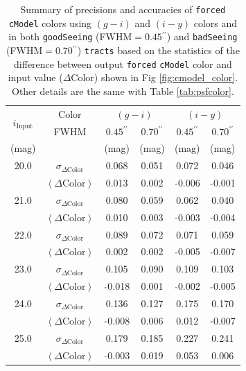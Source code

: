 \documentclass[useamsfonts]{pasj01}
\def\asec{$^{\prime\prime}$}
\def\cmodel{\texttt{cModel}}
\def\forced{\texttt{forced}}
\def\tracts{\texttt{tracts}}
\newcommand{\minus}{\raisebox{.4\height}{\scalebox{.8}{-}}}
\newcommand{\scolor}{$\sigma_{\Delta\mathrm{Color}}$}
\newcommand{\mcolor}{$\left<{\Delta\mathrm{Color}}\right>$}
\newcommand{\n}{$\minus$}
\begin{document}
\begin{table}
    \begin{center}
    \begin{tabular}{| c | c | c | c | c | c | }
    \hline
    \rowcolor[gray]{.85} \multicolumn{6}{|c|}{\large{Table}: Summary of \forced{} \cmodel{} Colors} \\
    \hline \hline 
    \multirow{2}{*}{$i_{\mathrm{Input}}$} & Color & \multicolumn{2}{|c|}{$(g-i)$} & \multicolumn{2}{|c|}{$(i-y)$} \\
    \cline{2-6}
      & FWHM & $0.45$\asec{} & $0.70$\asec{} & $0.45$\asec{} & $0.70$\asec{} \\
    \hline
    (mag) & & (mag) & (mag) & (mag) & (mag) \\
    \hline
    \rowcolor[gray]{.85} 20.0 & \scolor{} &   0.068 & 0.051 &   0.072 &   0.046 \\
    \rowcolor[gray]{.85}      & \mcolor{} &   0.013 & 0.002 & \n0.006 & \n0.001 \\
    \hline 
    \rowcolor[gray]{1.0} 21.0 & \scolor{} &   0.080 & 0.059 &   0.062 &   0.040 \\
    \rowcolor[gray]{1.0}      & \mcolor{} &   0.010 & 0.003 & \n0.003 & \n0.004 \\
    \hline
    \rowcolor[gray]{.85} 22.0 & \scolor{} &   0.089 & 0.072 &   0.071 &   0.059 \\
    \rowcolor[gray]{.85}      & \mcolor{} &   0.002 & 0.002 & \n0.005 & \n0.007 \\
    \hline
    \rowcolor[gray]{1.0} 23.0 & \scolor{} &   0.105 & 0.090 &   0.109 &   0.103 \\
    \rowcolor[gray]{1.0}      & \mcolor{} & \n0.018 & 0.001 & \n0.002 & \n0.005 \\
    \hline
    \rowcolor[gray]{.85} 24.0 & \scolor{} &   0.136 & 0.127 &   0.175 &   0.170 \\
    \rowcolor[gray]{.85}      & \mcolor{} & \n0.008 & 0.006 &   0.012 & \n0.007 \\
    \hline
    \rowcolor[gray]{1.0} 25.0 & \scolor{} &   0.179 & 0.185 &   0.227 &   0.241 \\
    \rowcolor[gray]{1.0}      & \mcolor{} & \n0.003 & 0.019 &   0.053 &   0.006 \\
    \hline
    \end{tabular}
    \end{center}
    \caption{
        Summary of precisions and accuracies of \forced{} \cmodel{} colors using 
        $(g-i)$ and $(i-y)$ colors and in both \texttt{goodSeeing} (FWHM$=0.45$\asec{}) 
        and \texttt{badSeeing} (FWHM$=0.70$\asec{}) \tracts{} based on the statistics of 
        the difference between output \forced{} \cmodel{} color and input value 
        ($\Delta\mathrm{Color}$) shown in Fig \ref{fig:cmodel_color}.
        Other details are the same with Table \ref{tab:psfcolor}.
    }
        \label{tab:cmodelcolor}
\end{table}
\end{document}

